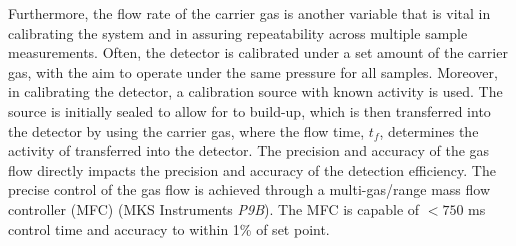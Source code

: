 Furthermore, the flow rate of the carrier gas is another variable that is vital in calibrating the system and in assuring repeatability across multiple sample measurements. Often, the detector is calibrated under a set amount of the carrier gas, with the aim to operate under the same pressure for all samples. Moreover, in calibrating the detector, a \RaTTS{} calibration source with known activity is used. The source is initially sealed to allow for \RnTTT{} to build-up, which is then transferred into the detector by using the carrier gas, where the flow time, $t_{f}$, determines the activity of \RnTTT{} transferred into the detector. The precision and accuracy of the gas flow directly impacts the precision and accuracy of the detection efficiency. The precise control of the gas flow is achieved through a multi-gas/range mass flow controller (MFC) (MKS Instruments \textit{P9B}). The MFC is capable of $<750$ ms control time and accuracy to within 1\% of set point. 

